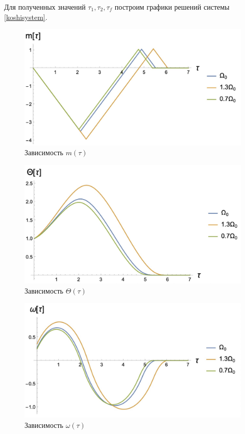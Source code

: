 \documentclass[a4paper,14pt]{article}
\theoremstyle{plain} %
\theoremstyle{definition} %
\theoremstyle{remark} %
\begin{document}
{Для полученных значений $\tau_1,\tau_2,\tau_f$ построим графики решений системы \eqref{koshisystem}.
\begin{figure}[h!]
    \centering
    \includegraphics[width=0.69\linewidth]{m.jpeg}
    \caption{Зависимость $m(\tau)$}
    \label{fig:m}
\end{figure}
\begin{figure}[h!]
    \centering
    \includegraphics[width=0.69\linewidth]{theta.jpeg}
    \caption{Зависимость $\Theta(\tau)$}
    \label{fig:theta}
\end{figure}
\begin{figure}[h!]
    \centering
    \includegraphics[width=0.69\linewidth]{omega.jpeg}
    \caption{Зависимость $\omega(\tau)$}
    \label{fig:omega}
\end{figure}


\newpage
}
\end{document}
